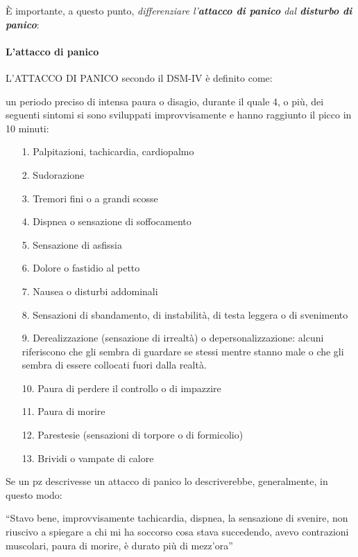 È importante, a questo punto, \emph{differenziare l'\textbf{attacco di
panico} dal \textbf{disturbo di panico}}:

\paragraph{L'attacco di panico}

L'ATTACCO DI PANICO secondo il DSM-IV è definito come:

un periodo preciso di intensa paura o disagio, durante il quale 4, o
più, dei seguenti sintomi si sono sviluppati improvvisamente e hanno
raggiunto il picco in 10 minuti:

\begin{itemize}
\item[1.]
  Palpitazioni, tachicardia, cardiopalmo
\item[2.]
  Sudorazione
\item[3.]
  Tremori fini o a grandi scosse
\item[4.]
  Dispnea o sensazione di soffocamento
\item[5.]
  Sensazione di asfissia
\item[6.]
  Dolore o fastidio al petto
\item[7.]
  Nausea o disturbi addominali
\item[8.]
  Sensazioni di sbandamento, di instabilità, di testa leggera o di
  svenimento
\item[9.]
  Derealizzazione (sensazione di irrealtà) o depersonalizzazione: alcuni
  riferiscono che gli sembra di guardare se stessi mentre stanno male o
  che gli sembra di essere collocati fuori dalla realtà.
\item[10.]
  Paura di perdere il controllo o di impazzire
\item[11.]
  Paura di morire
\item[12.]
  Parestesie (sensazioni di torpore o di formicolio)
\item[13.]
  Brividi o vampate di calore
\end{itemize}

Se un pz descrivesse un attacco di panico lo descriverebbe,
generalmente, in questo modo:

``Stavo bene, improvvisamente tachicardia, dispnea, la sensazione di
svenire, non riuscivo a spiegare a chi mi ha soccorso cosa stava
succedendo, avevo contrazioni muscolari, paura di morire, è durato più
di mezz'ora''

